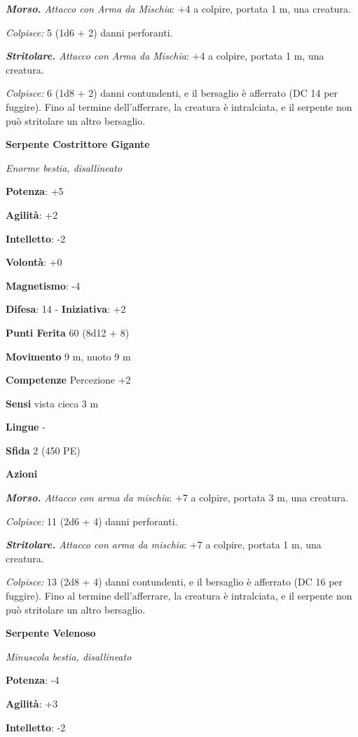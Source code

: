 \begin{multicols}{2}
\emph{\textbf{Morso.} Attacco con Arma da Mischia}: +4 a colpire,
portata 1 m, una creatura.

\emph{Colpisce:} 5 (1d6 + 2) danni perforanti.

\emph{\textbf{Stritolare.} Attacco con Arma da Mischia}: +4 a colpire,
portata 1 m, una creatura.

\emph{Colpisce:} 6 (1d8 + 2) danni contundenti, e il bersaglio è
afferrato (DC 14 per fuggire). Fino al termine dell'afferrare, la
creatura è intralciata, e il serpente non può stritolare un altro
bersaglio.

\textbf{Serpente Costrittore Gigante}

\emph{Enorme bestia, disallineato}

\textbf{Potenza}: +5

\textbf{Agilità}: +2

\textbf{Intelletto}: -2

\textbf{Volontà}: +0

\textbf{Magnetismo}: -4

\textbf{Difesa}: 14 - \textbf{Iniziativa}: +2

\textbf{Punti Ferita} 60 (8d12 + 8)

\textbf{Movimento} 9 m, nuoto 9 m

\textbf{Competenze} Percezione +2

\textbf{Sensi} vista cieca 3 m

\textbf{Lingue} -

\textbf{Sfida} 2 (450 PE)\smallskip

\smallskip\textbf{Azioni}

\emph{\textbf{Morso.} Attacco con arma da mischia}: +7 a colpire,
portata 3 m, una creatura.

\emph{Colpisce:} 11 (2d6 + 4) danni perforanti.

\emph{\textbf{Stritolare.} Attacco con arma da mischia}: +7 a colpire,
portata 1 m, una creatura.

\emph{Colpisce:} 13 (2d8 + 4) danni contundenti, e il bersaglio è
afferrato (DC 16 per fuggire). Fino al termine dell'afferrare, la
creatura è intralciata, e il serpente non può stritolare un altro
bersaglio.



\textbf{Serpente Velenoso}

\emph{Minuscola bestia, disallineato}

\textbf{Potenza}: -4

\textbf{Agilità}: +3

\textbf{Intelletto}: -2


\end{multicols}
